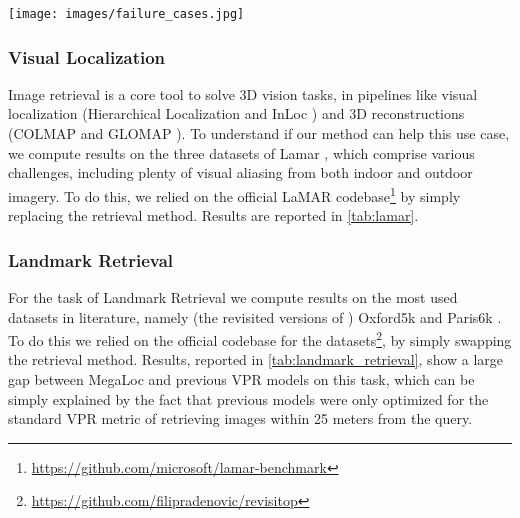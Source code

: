 \begin{figure*}
    \begin{center}
    \texttt{[image: images/failure\_cases.jpg]}
    \end{center}
    \caption{\textbf{Failure cases, grouped in 4 categories.} Each one of the 4 column represent a category of failure cases: for each category we show 5 examples, made of 3 images, namely the query and its top-2 predictions with MegaLoc, which can be in red or green depending if the prediction is correct (\ie within 25 meters).
    The 4 categories that we identified are (1) \textit{very difficult cases}, which are unlikely to be solved any time soon; (2) \textit{difficult cases}, which can probably be solved by slightly better models than the current ones or simple post-processing; (3) \textit{incorrect GPS labels}, which, surprisingly, exist also in Mapillary and Google StreetView data; (4) \textit{predictions just out of the 25m threshold}, which despite being considered negatives in VPR, are actually useful predictions for real-world applications.}
    \label{fig:failure_cases}
\end{figure*}



\subsubsection{Visual Localization}
\label{sec:results_lamar}
Image retrieval is a core tool to solve 3D vision tasks, in pipelines like visual localization (\eg Hierarchical Localization \cite{Sarlin_2019_hloc} and InLoc \cite{Taira_2018_inloc}) and 3D reconstructions (\eg COLMAP \cite{Schoenberger_2016_mvs_colmap, Schoenberger_2016_sfm_colmap} and GLOMAP \cite{pan2024glomap}).
To understand if our method can help this use case, we compute results on the three datasets of Lamar \cite{sarlin2022lamar}, which comprise various challenges, including plenty of visual aliasing from both indoor and outdoor imagery.
To do this, we relied on the official LaMAR codebase\footnote{\url{https://github.com/microsoft/lamar-benchmark}} by simply replacing the retrieval method.
Results are reported in \cref{tab:lamar}.



\subsubsection{Landmark Retrieval}
\label{sec:results_lr}
For the task of Landmark Retrieval we compute results on the most used datasets in literature, namely (the revisited versions of \cite{Radenovic_CVPR_2018_roxford_rparis}) Oxford5k \cite{Philbin_2007_oxford5k} and Paris6k \cite{Philbin_2008_paris6k}.
To do this we relied on the official codebase for the datasets\footnote{\url{https://github.com/filipradenovic/revisitop}}, by simply swapping the retrieval method.
Results, reported in \cref{tab:landmark_retrieval}, show a large gap between MegaLoc and previous VPR models on this task, which can be simply explained by the fact that previous models were only optimized for the standard VPR metric of retrieving images within 25 meters from the query.


